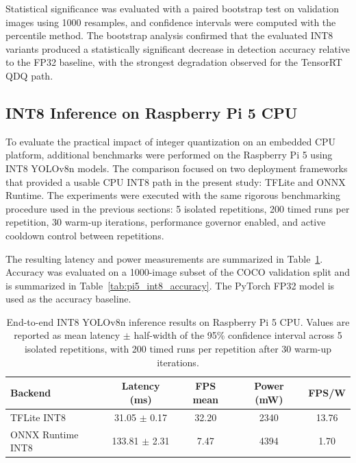 \documentclass[12pt,a4paper]{report}
\begin{document}
Statistical significance was evaluated with a paired bootstrap test on validation images using 1000 resamples, and
confidence intervals were computed with the percentile method. The bootstrap analysis confirmed that the evaluated INT8
variants produced a statistically significant decrease in detection accuracy relative to the FP32 baseline, with the
strongest degradation observed for the TensorRT QDQ path.

\subsection{INT8 Inference on Raspberry Pi 5 CPU}
\label{sec:pi5_int8_results}

To evaluate the practical impact of integer quantization on an embedded CPU platform, additional
benchmarks were performed on the Raspberry Pi 5 using INT8 YOLOv8n models. The comparison focused
on two deployment frameworks that provided a usable CPU INT8 path in the present study: TFLite and
ONNX Runtime. The experiments were executed with the same rigorous benchmarking procedure used in
the previous sections: 5 isolated repetitions, 200 timed runs per repetition, 30 warm-up iterations,
performance governor enabled, and active cooldown control between repetitions.

The resulting latency and power measurements are summarized in Table~\ref{tab:pi5_int8_benchmark}.
Accuracy was evaluated on a 1000-image subset of the COCO validation split and is summarized in
Table~\ref{tab:pi5_int8_accuracy}. The PyTorch FP32 model is used as the accuracy baseline.

\begin{table}[ht]
\centering
\caption{End-to-end INT8 YOLOv8n inference results on Raspberry Pi 5 CPU. Values are reported as
mean latency $\pm$ half-width of the 95\% confidence interval across 5 isolated repetitions, with
200 timed runs per repetition after 30 warm-up iterations.}
\label{tab:pi5_int8_benchmark}
\begin{tabular}{lcccc}
\toprule
Backend & Latency (ms) & FPS mean & Power (mW) & FPS/W \\
\midrule
TFLite INT8      & 31.05 $\pm$ 0.17 & 32.20 & 2340 & 13.76 \\
ONNX Runtime INT8 & 133.81 $\pm$ 2.31 & 7.47  & 4394 & 1.70 \\
\bottomrule
\end{tabular}
\end{table}
\end{document}
